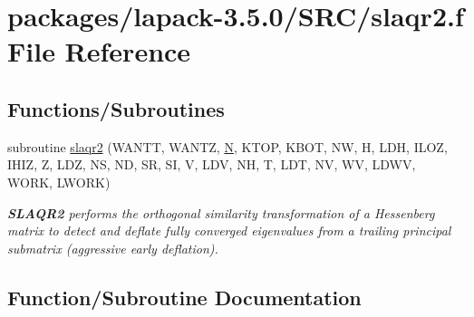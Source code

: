 \hypertarget{slaqr2_8f}{}\section{packages/lapack-\/3.5.0/\+S\+R\+C/slaqr2.f File Reference}
\label{slaqr2_8f}
\subsection*{Functions/\+Subroutines}
\begin{DoxyCompactItemize}
\item 
subroutine \hyperlink{slaqr2_8f_ac02e99ae434938e706dee8a37993a995}{slaqr2} (W\+A\+N\+T\+T, W\+A\+N\+T\+Z, \hyperlink{polmisc_8c_a0240ac851181b84ac374872dc5434ee4}{N}, K\+T\+O\+P, K\+B\+O\+T, N\+W, H, L\+D\+H, I\+L\+O\+Z, I\+H\+I\+Z, Z, L\+D\+Z, N\+S, N\+D, S\+R, S\+I, V, L\+D\+V, N\+H, T, L\+D\+T, N\+V, W\+V, L\+D\+W\+V, W\+O\+R\+K, L\+W\+O\+R\+K)
\begin{DoxyCompactList}\small\item\em {\bfseries S\+L\+A\+Q\+R2} performs the orthogonal similarity transformation of a Hessenberg matrix to detect and deflate fully converged eigenvalues from a trailing principal submatrix (aggressive early deflation). \end{DoxyCompactList}\end{DoxyCompactItemize}


\subsection{Function/\+Subroutine Documentation}
\hypertarget{slaqr2_8f_ac02e99ae434938e706dee8a37993a995}{}
